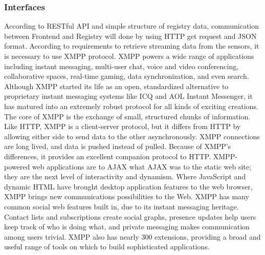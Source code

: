     \subsubsection{Interfaces}
    According to RESTful API and simple structure of registry data, communication between Frontend and Registry will done by using HTTP get request and JSON format.
    \newline
    According to requirements to retrieve streaming data from the sensors, it is necessary to use XMPP protocol\cite{XMPPbook}.
    XMPP powers a wide range of applications including instant messaging, multi-user chat, voice and video conferencing, collaborative spaces, real-time gaming, data synchronization, and even search. Although XMPP started its life as an open, standardized alternative to proprietary instant messaging systems like ICQ and AOL Instant Messenger, it has matured into an extremely robust protocol for all kinds of exciting creations.
    \newline
    The core of XMPP is the exchange of small, structured chunks of information. Like HTTP, XMPP is a client-server protocol, but it differs from HTTP by allowing either side to send data to the other asynchronously. XMPP connections are long lived, and data is pushed instead of pulled. Because of XMPP’s differences, it provides an excellent companion protocol to HTTP. XMPP-powered web applications are to AJAX what AJAX was to the static web site; they are the next level of interactivity and dynamism. Where JavaScript and dynamic HTML have brought desktop application features to the web browser, XMPP brings new communications possibilities to the Web. XMPP has many common social web features built in, due to its instant messaging heritage. Contact lists and subscriptions create social graphs, presence updates help users keep track of who is doing what, and private messaging makes communication among users trivial. XMPP also has nearly 300 extensions, providing a broad and useful range of tools on which to build sophisticated applications. 
    \newline
